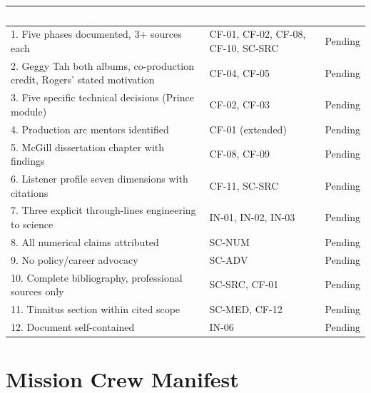 \documentclass[11pt,letterpaper]{article}
\newcommand{\tableheader}[1]{\textbf{\sffamily\textcolor{white}{#1}}}
\begin{document}
\begin{center}
\begin{tabularx}{\textwidth}{XL{3.5cm}C{1.5cm}}
\toprule
{}
\tableheader{Success Criterion} & \tableheader{Test ID(s)} & \tableheader{Status} \\
. Five phases documented, 3+ sources each & CF-01, CF-02, CF-08, CF-10, SC-SRC & Pending \\
2. Geggy Tah both albums, co-production credit, Rogers' stated motivation & CF-04, CF-05 & Pending \\
3. Five specific technical decisions (Prince module) & CF-02, CF-03 & Pending \\
4. Production arc mentors identified & CF-01 (extended) & Pending \\
5. McGill dissertation chapter with findings & CF-08, CF-09 & Pending \\
6. Listener profile seven dimensions with citations & CF-11, SC-SRC & Pending \\
7. Three explicit through-lines engineering to science & IN-01, IN-02, IN-03 & Pending \\
8. All numerical claims attributed & SC-NUM & Pending \\
9. No policy/career advocacy & SC-ADV & Pending \\
10. Complete bibliography, professional sources only & SC-SRC, CF-01 & Pending \\
11. Tinnitus section within cited scope & SC-MED, CF-12 & Pending \\
12. Document self-contained & IN-06 & Pending \\
\bottomrule
\end{tabularx}
\end{center}

\section{Mission Crew Manifest}
\end{document}
